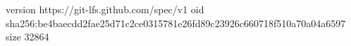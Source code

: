 version https://git-lfs.github.com/spec/v1
oid sha256:be4baecdd2fae25d71c2ce0315781e26fd89c23926c660718f510a70a04a6597
size 32864
